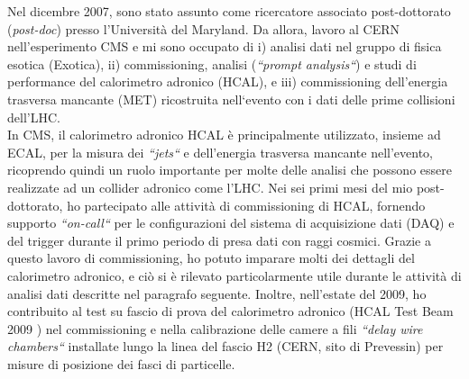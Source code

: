 \documentclass[10pt, a4paper]{article}
\begin{document}
Nel dicembre 2007, sono stato assunto come ricercatore associato post-dottorato ({\it post-doc}) presso 
l'Universit\`a del Maryland. Da allora, lavoro al CERN nell'esperimento CMS e mi sono occupato di i) analisi dati 
nel gruppo di fisica esotica (Exotica), ii) commissioning, analisi ({\it``prompt analysis``}) e studi di performance 
del calorimetro adronico (HCAL), e iii) commissioning dell'energia trasversa mancante (MET) ricostruita 
nell`evento con i dati delle prime collisioni dell'LHC. \\

In CMS, il calorimetro adronico HCAL \`e principalmente utilizzato, insieme ad ECAL, per la misura dei 
{\it ``jets``} e dell'energia trasversa mancante nell'evento, ricoprendo quindi un ruolo importante per molte delle 
analisi che possono essere realizzate ad un collider adronico come l'LHC. Nei sei primi mesi del mio 
post-dottorato, ho partecipato alle attivit\`a di commissioning di HCAL, fornendo supporto {\it ``on-call``} 
per le configurazioni del sistema di acquisizione dati (DAQ) e del trigger durante il primo periodo di presa dati 
con raggi cosmici. Grazie a questo lavoro di commissioning, ho potuto imparare molti dei dettagli del calorimetro 
adronico, e ci\`o si \`e rilevato particolarmente utile durante le attivit\`a di analisi dati descritte nel paragrafo seguente. 
Inoltre, nell'estate del 2009, ho contribuito al test su fascio di prova del 
calorimetro adronico (HCAL Test Beam 2009 \cite{Chatrchyan:2010zz}) nel commissioning e 
nella calibrazione delle camere a fili  {\it ``delay wire chambers``} installate lungo la linea del fascio 
H2 (CERN, sito di Prevessin) per misure di posizione dei fasci di particelle. \\
\end{document}
